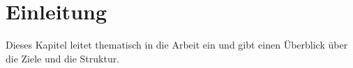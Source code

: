 \chapter{Einleitung}\label{ch:einleitung}

Dieses Kapitel leitet thematisch in die Arbeit ein und gibt einen Überblick über die Ziele und die Struktur.





